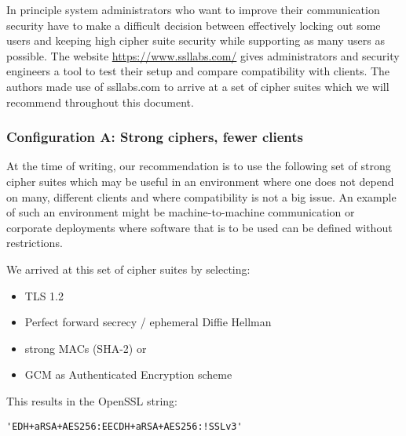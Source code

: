 
In principle system administrators who want to improve their communication security
have to make a difficult decision between effectively locking out some users and 
keeping high cipher suite security while supporting as many users as possible.
The website \url{https://www.ssllabs.com/} gives administrators and security engineers
a tool to test their setup and compare compatibility with clients. The authors made 
use of ssllabs.com to arrive at a set of cipher suites which we will recommend 
throughout this document.



\subsubsection{Configuration A: Strong ciphers, fewer clients}

At the time of writing, our recommendation is to use the following set of strong cipher
suites which may be useful in an environment where one does not depend on many,
different clients and where compatibility is not a big issue.  An example
of such an environment might be machine-to-machine communication or corporate
deployments where software that is to be used can be defined without restrictions.


We arrived at this set of cipher suites by selecting:

\begin{itemize}
  \item TLS 1.2
  \item Perfect forward secrecy / ephemeral Diffie Hellman
  \item strong MACs (SHA-2) or
  \item GCM as Authenticated Encryption scheme
\end{itemize}

This results in the OpenSSL string:

\begin{lstlisting}
'EDH+aRSA+AES256:EECDH+aRSA+AES256:!SSLv3'
\end{lstlisting}

